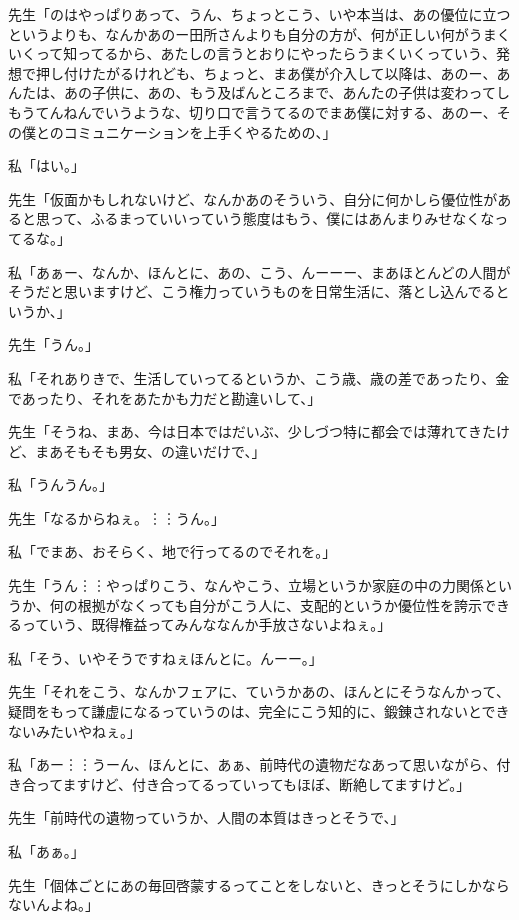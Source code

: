 \documentclass[b5j,twoside,twocolumn]{utarticle}
\begin{document}
\begin{description}
\item 先生「のはやっぱりあって、うん、ちょっとこう、いや本当は、あの優位に立つというよりも、なんかあのー田所さんよりも自分の方が、何が正しい何がうまくいくって知ってるから、あたしの言うとおりにやったらうまくいくっていう、発想で押し付けたがるけれども、ちょっと、まあ僕が介入して以降は、あのー、あんたは、あの子供に、あの、もう及ばんところまで、あんたの子供は変わってしもうてんねんでいうような、切り口で言うてるのでまあ僕に対する、あのー、その僕とのコミュニケーションを上手くやるための、」
\item 私「はい。」
\item 先生「仮面かもしれないけど、なんかあのそういう、自分に何かしら優位性があると思って、ふるまっていいっていう態度はもう、僕にはあんまりみせなくなってるな。」
\item 私「あぁー、なんか、ほんとに、あの、こう、んーーー、まあほとんどの人間がそうだと思いますけど、こう権力っていうものを日常生活に、落とし込んでるというか、」
\item 先生「うん。」
\item 私「それありきで、生活していってるというか、こう歳、歳の差であったり、金であったり、それをあたかも力だと勘違いして、」
\item 先生「そうね、まあ、今は日本ではだいぶ、少しづつ特に都会では薄れてきたけど、まあそもそも男女、の違いだけで、」
\item 私「うんうん。」
\item 先生「なるからねぇ。︙︙うん。」
\item 私「でまあ、おそらく、地で行ってるのでそれを。」
\item 先生「うん︙︙やっぱりこう、なんやこう、立場というか家庭の中の力関係というか、何の根拠がなくっても自分がこう人に、支配的というか優位性を誇示できるっていう、既得権益ってみんななんか手放さないよねぇ。」
\item 私「そう、いやそうですねぇほんとに。んーー。」
\item 先生「それをこう、なんかフェアに、ていうかあの、ほんとにそうなんかって、疑問をもって謙虚になるっていうのは、完全にこう知的に、鍛錬されないとできないみたいやねぇ。」
\item 私「あー︙︙うーん、ほんとに、あぁ、前時代の遺物だなあって思いながら、付き合ってますけど、付き合ってるっていってもほぼ、断絶してますけど。」
\item 先生「前時代の遺物っていうか、人間の本質はきっとそうで、」
\item 私「あぁ。」
\item 先生「個体ごとにあの毎回啓蒙するってことをしないと、きっとそうにしかならないんよね。」

\end{description}
\end{document}
